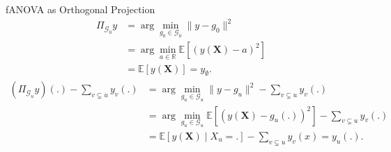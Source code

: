 \begin{frame}{fANOVA as Orthogonal Projection} %
  \begin{align*}
    \Pi_{\mathcal{G}_0}y
    &= \arg \min_{g_0 \in \mathcal{G}_0} \|y - g_0\|^2 \\ 
    &= \arg \min_{a \in \mathbb{R}} \mathbb{E}[(y(\boldsymbol{X}) - a)^2] \\ 
    &= \mathbb{E}[y(\boldsymbol{X})] = y_{\emptyset}.
\end{align*}
  \begin{align*}
    (\Pi_{\mathcal{G}_u}y)(.) - \sum_{v \subsetneq u} y_v(.)
    &= \arg \min_{g_u \in \mathcal{G}_u} \|y - g_u\|^2 - \sum_{v \subsetneq u} y_v(.)\\
    &= \arg \min_{g_u \in \mathcal{G}_{u}} \mathbb{E}[(y(\boldsymbol{X}) - g_u(.))^2] - \sum_{v \subsetneq u} y_v(.)\\
    &= \mathbb{E}[y(\boldsymbol{X}) \mid X_{u} = .] - \sum_{v \subsetneq u} y_v(x) = y_u(.).
\end{align*}
  
\end{frame}
